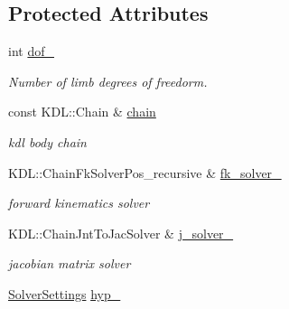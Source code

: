 \subsection*{Protected Attributes}
\begin{DoxyCompactItemize}
\item 
int \hyperlink{classow__ik_1_1IkSolverNullspace_a947f20719f701254d79b2636eba81e3f}{dof\+\_\+}\hypertarget{classow__ik_1_1IkSolverNullspace_a947f20719f701254d79b2636eba81e3f}{}\label{classow__ik_1_1IkSolverNullspace_a947f20719f701254d79b2636eba81e3f}

\begin{DoxyCompactList}\small\item\em Number of limb degrees of freedorm. \end{DoxyCompactList}\item 
const K\+D\+L\+::\+Chain \& \hyperlink{classow__ik_1_1IkSolverNullspace_a947bba59c9fbeb748f6daade02e970b5}{chain}\hypertarget{classow__ik_1_1IkSolverNullspace_a947bba59c9fbeb748f6daade02e970b5}{}\label{classow__ik_1_1IkSolverNullspace_a947bba59c9fbeb748f6daade02e970b5}

\begin{DoxyCompactList}\small\item\em kdl body chain \end{DoxyCompactList}\item 
K\+D\+L\+::\+Chain\+Fk\+Solver\+Pos\+\_\+recursive \& \hyperlink{classow__ik_1_1IkSolverNullspace_a21b01edcf1bf04a8bff1eb002b8b41e7}{fk\+\_\+solver\+\_\+}\hypertarget{classow__ik_1_1IkSolverNullspace_a21b01edcf1bf04a8bff1eb002b8b41e7}{}\label{classow__ik_1_1IkSolverNullspace_a21b01edcf1bf04a8bff1eb002b8b41e7}

\begin{DoxyCompactList}\small\item\em forward kinematics solver \end{DoxyCompactList}\item 
K\+D\+L\+::\+Chain\+Jnt\+To\+Jac\+Solver \& \hyperlink{classow__ik_1_1IkSolverNullspace_acf1de6445ccca128c0d48955214b773e}{j\+\_\+solver\+\_\+}\hypertarget{classow__ik_1_1IkSolverNullspace_acf1de6445ccca128c0d48955214b773e}{}\label{classow__ik_1_1IkSolverNullspace_acf1de6445ccca128c0d48955214b773e}

\begin{DoxyCompactList}\small\item\em jacobian matrix solver \end{DoxyCompactList}\item 
\hyperlink{classow__ik_1_1SolverSettings}{Solver\+Settings} \hyperlink{classow__ik_1_1IkSolverNullspace_a6b80962595200794eced47d857e9c796}{hyp\+\_\+}\hypertarget{classow__ik_1_1IkSolverNullspace_a6b80962595200794eced47d857e9c796}{}\label{classow__ik_1_1IkSolverNullspace_a6b80962595200794eced47d857e9c796}


\end{DoxyCompactItemize}
